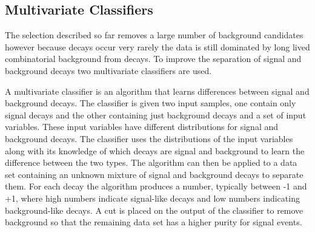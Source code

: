 



\subsection{Multivariate Classifiers}
\label{sec:MVC}

The selection described so far removes a large number of background candidates however because \bmumu decays occur very rarely the data is still dominated by long lived combinatorial background from \bbbarmumux decays. To improve the separation of signal and background decays two  multivariate classifiers are used.

A multivariate classifier is an algorithm that learns differences between signal and background decays. The classifier is given two input samples, one contain only signal decays and the other containing just background decays and a set of input variables. These input variables have different distributions for signal and background decays. The classifier uses the distributions of the input variables along with its knowledge of which decays are signal and background to learn the difference between the two types. The algorithm can then be applied to a data set containing an unknown mixture of signal and background decays to separate them. For each decay the algorithm produces a number, typically between -1 and +1, where high numbers indicate signal-like decays and low numbers indicating background-like decays. A cut is placed on the output of the classifier to remove background so that the remaining data set has a higher purity for signal events.

